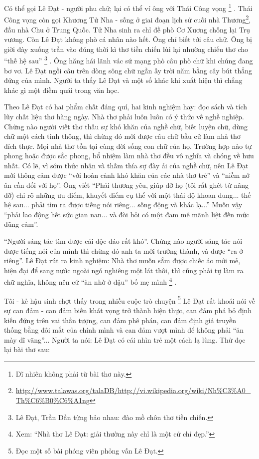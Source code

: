 \documentclass[../main.tex]{subfiles}
\begin{document}
\begin{multicols}{2}
Có thể gọi Lê Đạt - người phu chữ; lại có thể ví ông với Thái Công vọng \footnote{
Dĩ nhiên không phải từ bài thơ này.} . Thái Công vọng còn gọi Khương Tử Nha - sống ở giai đoạn lịch sử cuối nhà Thương\footnote{\url{http://www.talawas.org/talaDB/http://vi.wikipedia.org/wiki/Nh%C3%A0_Th%C6%B0%C6%A1ng}}, đầu nhà Chu ở Trung Quốc. Tử Nha sinh ra chỉ đề phò Cơ Xương chống lại Trụ vương. Còn Lê Đạt không phò cá nhân nào hết. Ông chỉ biết tới câu chữ. Ông bị giời đày xuống trần vào đúng thời kì thơ tiền chiến lùi lại nhường chiếu thơ cho “thế hệ sau” \footnote{
Lê Đạt, Trần Dần từng bảo nhau: đào mồ chôn thơ tiền chiến.} . Ông hăng hái lãnh vác sứ mạng phò câu phò chữ khi chúng đang bơ vơ. Lê Đạt ngồi câu trên dòng sông chữ ngần ấy trời năm bằng cây bút thẳng đứng của mình. Người ta thấy Lê Đạt và một số khác khi xuất hiện thì chẳng khác gì một điềm quái trong văn học. 
 
Theo Lê Đạt có hai phẩm chất đáng quí, hai kinh nghiệm hay: đọc sách và tích lũy chất liệu thơ hàng ngày. Nhà thơ phải luôn luôn có ý thức về nghề nghiệp. Chừng nào người viết thơ thấu sự khó khăn của nghề chữ, biết luyện chữ, dùng chữ một cách tinh thông, thì chừng đó mới được câu chữ bầu cử làm nhà thơ đích thực. Mọi nhà thơ tồn tại cùng đời sống con chữ của họ. Trường hợp nào tự phong hoặc được sắc phong, bổ nhiệm làm nhà thơ đều vô nghĩa và chóng về hưu nhất. Có lẽ, vì sớm thức nhận và thấm thía sự đày ải của nghề chữ, nên Lê Đạt mới thông cảm được “với hoàn cảnh khó khăn của các nhà thơ trẻ” và “niềm nở ân cần đối với họ”. Ông viết “Phải thương yêu, giúp đỡ họ (tôi rất ghét từ nâng đỡ) chỉ rõ những ưu điểm, khuyết điểm cụ thể với một thái độ khoan dung... thế hệ sau... phải tìm ra được tiếng nói riêng... sống động và khác lạ...” Muốn vậy “phải lao động hết sức gian nan... và đòi hỏi có một đam mê mãnh liệt đến mức dũng cảm”. 
 
“Người sáng tác tìm được cái độc đáo rất khó”. Chừng nào người sáng tác nói được tiếng nói của mình thì chừng đó anh ta mới trưởng thành, và được “ra ở riêng”. Lê Đạt rút ra kinh nghiệm: Nhà thơ muốn sắm được chiếc áo mới mẻ, hiện đại để sang nước ngoài ngó nghiêng một lát thôi, thì cũng phải tự làm ra chữ nghĩa, không nên cứ “ăn nhờ ở đậu” bố mẹ mình \footnote{
Xem: “Nhà thơ Lê Đạt: giải thường này chỉ là một cử chỉ đẹp.”} . 
 
Tôi - kẻ hậu sinh chợt thấy trong nhiều cuộc trò chuyện \footnote{
Đọc một số bài phóng viên phỏng vấn Lê Đạt.}  Lê Đạt rất khoái nói về sự can đảm - can đảm biến khát vọng trở thành hiện thực, can đảm phá bỏ định kiến đứng trên vai thần tượng, can đảm phê phán, can đảm định giá truyền thống bằng đôi mắt của chính mình và can đảm vượt mình để không phải “ăn mày dĩ vãng”... Người ta nói: Lê Đạt có cái nhìn trẻ một cách lạ lùng. Thử đọc lại bài thơ sau: 
\begin{blockquote}
				 

\end{blockquote}
\end{multicols}
\end{document}

